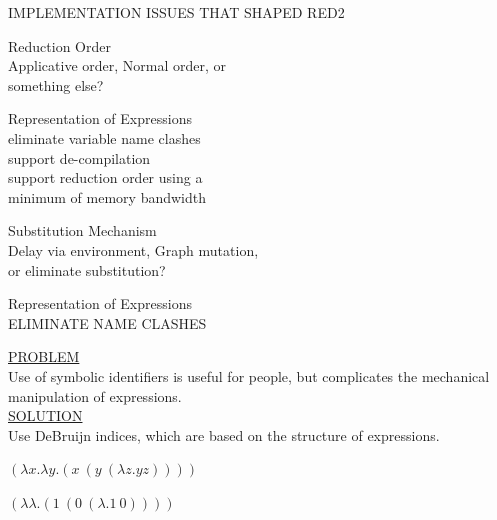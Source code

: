 \begin{slide}{}
\begin{center}
IMPLEMENTATION ISSUES THAT SHAPED RED2
\end{center}

Reduction Order\\
\hspace*{1.5em} Applicative order, Normal order, or \\ 
\hspace*{1.5em} something else?

Representation of Expressions\\
\hspace*{1.5em} \head eliminate variable name clashes\\
\hspace*{1.5em} \head support de-compilation\\
\hspace*{1.5em} \head support reduction order using a \\
\hspace*{2em} minimum of memory bandwidth

Substitution Mechanism\\
\hspace*{1.5em} Delay via environment, Graph mutation,\\
\hspace*{1.5em} or eliminate substitution?
\end{slide}



\begin{slide}{}
\begin{center}
Representation of Expressions\\[.5em]
ELIMINATE NAME CLASHES\\[2em]
\end{center}

\begin{flushleft}
\underline{PROBLEM}\\
Use of symbolic identifiers is useful
for people, but complicates the mechanical manipulation
of expressions.\\[.5in]
\underline{SOLUTION}\\
Use DeBruijn indices, which are based on the structure of
expressions.\\[1in]
\end{flushleft}
\begin{center}
\( (\lambda x . \lambda y . (x \ (y \ (\lambda z . y z)))) \)

\( (\lambda \lambda . (1 \ (0 \ (\lambda.1 \ 0)))) \)
\end{center}

\end{slide}



